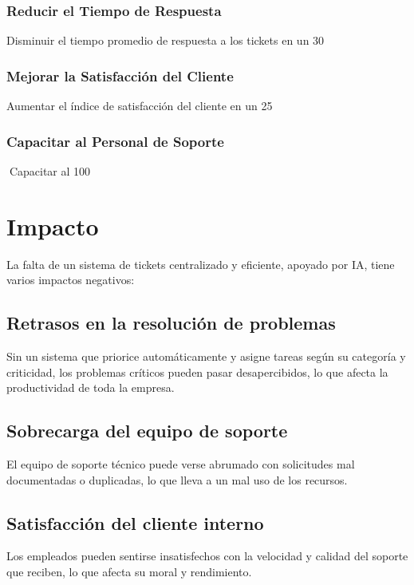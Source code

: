 \documentclass[a4paper,12pt]{article}
\begin{document}
\subsubsection{Reducir el Tiempo de Respuesta}
Disminuir el tiempo promedio de respuesta a los tickets en un 30%
\subsubsection{Mejorar la Satisfacción del Cliente}
Aumentar el índice de satisfacción del cliente en un 25%

\subsubsection{Capacitar al Personal de Soporte}
Capacitar al 100%

\section{Impacto}
La falta de un sistema de tickets centralizado y eficiente, apoyado por IA, tiene varios impactos negativos:

\subsection{Retrasos en la resolución de problemas}
Sin un sistema que priorice automáticamente y asigne tareas según su categoría y criticidad, los problemas críticos pueden pasar desapercibidos, lo que afecta la productividad de toda la empresa.


\subsection{Sobrecarga del equipo de soporte}
El equipo de soporte técnico puede verse abrumado con solicitudes mal documentadas o duplicadas, lo que lleva a un mal uso de los recursos.

\subsection{Satisfacción del cliente interno}
Los empleados pueden sentirse insatisfechos con la velocidad y calidad del soporte que reciben, lo que afecta su moral y rendimiento.
\end{document}
